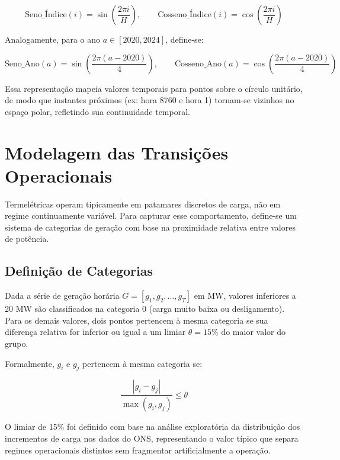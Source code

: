 \begin{equation}
\text{Seno\_Índice}(i) = \sin\left(\frac{2\pi i}{H}\right), \qquad
\text{Cosseno\_Índice}(i) = \cos\left(\frac{2\pi i}{H}\right)
\label{eq:codificacao_indice}
\end{equation}

Analogamente, para o ano \(a \in [2020, 2024]\), define-se:

\begin{equation}
\text{Seno\_Ano}(a) = \sin\left(\frac{2\pi (a - 2020)}{4}\right), \qquad
\text{Cosseno\_Ano}(a) = \cos\left(\frac{2\pi (a - 2020)}{4}\right)
\label{eq:codificacao_ano}
\end{equation}

Essa representação mapeia valores temporais para pontos sobre o círculo unitário, de modo que instantes próximos (ex: hora 8760 e hora 1) tornam-se vizinhos no espaço polar, refletindo sua continuidade temporal.

\section{Modelagem das Transições Operacionais}

Termelétricas operam tipicamente em patamares discretos de carga, não em regime continuamente variável. Para capturar esse comportamento, define-se um sistema de categorias de geração com base na proximidade relativa entre valores de potência.

\subsection{Definição de Categorias}

Dada a série de geração horária \(G = [g_1, g_2, \ldots, g_T]\) em MW, valores inferiores a 20 MW são classificados na categoria 0 (carga muito baixa ou desligamento). Para os demais valores, dois pontos pertencem à mesma categoria se sua diferença relativa for inferior ou igual a um limiar \(\theta = 15\%\) do maior valor do grupo.

Formalmente, \(g_i\) e \(g_j\) pertencem à mesma categoria se:

\begin{equation}
\frac{|g_i - g_j|}{\max(g_i, g_j)} \leq \theta
\label{eq:diferenca_relativa}
\end{equation}

O limiar de 15\% foi definido com base na análise exploratória da distribuição dos incrementos de carga nos dados do \ac{ONS}, representando o valor típico que separa regimes operacionais distintos sem fragmentar artificialmente a operação.


